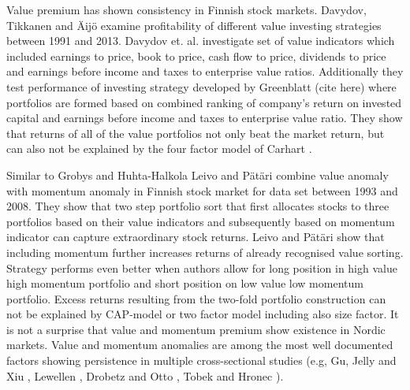 \documentclass{article}
\begin{document}
Value premium has shown consistency in Finnish stock markets. Davydov, Tikkanen and Äijö \citeyear{Davydov2017MagicFV} examine profitability of different value investing strategies between 1991 and 2013. Davydov et. al. investigate set of value indicators which included earnings to price, book to price, cash flow to price, dividends to price and earnings before income and taxes to enterprise value ratios. Additionally they test performance of investing strategy developed by Greenblatt (cite here) where portfolios are formed based on combined ranking of company's return on invested capital and earnings before income and taxes to enterprise value ratio. They show that returns of all of the value portfolios not only beat the market return, but can also not be explained by the four factor model of Carhart \citeyear{https://doi.org/10.1111/j.1540-6261.1997.tb03808.x}.  \par

Similar to Grobys and Huhta-Halkola \citeyear{grobys} Leivo and Pätäri \citeyear{leivo2011} combine value anomaly with momentum anomaly in Finnish stock market for data set between 1993 and 2008. They show that two step portfolio sort that first allocates stocks to three portfolios based on their value indicators and subsequently based on momentum indicator can capture extraordinary stock returns. Leivo and Pätäri show that including momentum further increases returns of already recognised value sorting. Strategy performs even better when authors allow for long position in high value high momentum portfolio and short position on low value low momentum portfolio. Excess returns resulting from the two-fold portfolio construction can not be explained by CAP-model or two factor model including also size factor. It is not a surprise that value and momentum premium show existence in Nordic markets. Value and momentum anomalies are among the most well documented factors showing persistence in multiple cross-sectional studies (e.g, Gu, Jelly and Xiu \citeyear{guetal}, Lewellen \citeyear{Lewellen2015}, Drobetz and Otto \citeyear{Drobetz}, Tobek and Hronec \citeyear{TOBEK2021100588}). \par
\end{document}
